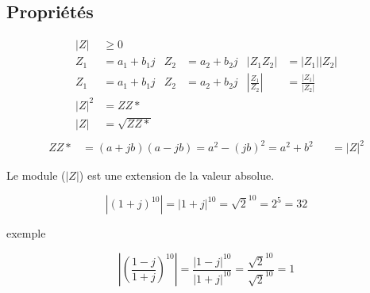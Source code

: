 \documentclass[a4paper,11pt]{report}
\begin{document}
\subsection{Propriétés}
\begin{align}
   |Z| &\geqslant 0 \\
   Z_1 &= a_1 + b_1j & Z_2 &= a_2 + b_2j & |Z_1Z_2| &= |Z_1||Z_2|  \\
   Z_1 &= a_1 + b_1j & Z_2 &= a_2 + b_2j & |\frac{Z_1}{Z_2}| &= \frac{|Z_1|}{|Z_2|} \\
   |Z|^2 &= ZZ* \\
   |Z| &= \sqrt{ZZ*} \\
\end{align}
\begin{align*}
   ZZ* &= (a+jb)(a-jb) = a^2-(jb)^2 = a^2 + b^2 &&= |Z|^2
\end{align*}

Le module ($|Z|$) est une extension de la valeur absolue.

\[
   |(1+j)^{10}| = |1+j|^{10} = \sqrt{2}^{10} = 2^5 = 32
\]

exemple

\[
   |(\frac{1-j}{1+j})^{10}| = \frac{|1-j|^{10}}{|1+j|^{10}} = \frac{\sqrt{2}^{10}}{\sqrt{2}^{10}} = 1
\]
\end{document}
